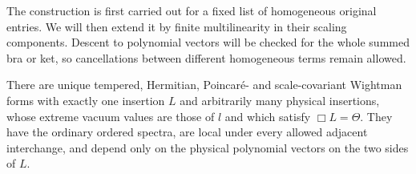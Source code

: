 The construction is first carried out for a fixed list of homogeneous
original entries.  We will then extend it by finite multilinearity in
their scaling components.  Descent to polynomial vectors will be
checked for the whole summed bra or ket, so cancellations between
different homogeneous terms remain allowed.

\begin{proposition}\label{C:single-insertion}
There are unique tempered, Hermitian, Poincar\'e- and scale-covariant
Wightman forms with exactly one insertion $L$ and arbitrarily many
physical insertions, whose extreme vacuum values are those of $l$ and
which satisfy $\Box L=\Theta$. They have the ordinary ordered spectra,
are local under every allowed adjacent interchange, and depend only on
the physical polynomial vectors on the two sides of $L$.
\end{proposition}


